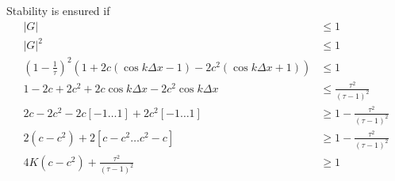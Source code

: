 \documentclass[12pt]{article}
\begin{document}
Stability is ensured if
\begin{align*}
|G|&\leq 1 \\
|G|^2&\leq 1 \\
\left(1-\frac{1}{\tau}\right)^2\left(1
		+2c\left(\cos{k\Delta x}-1\right)
		-2c^2\left(\cos{k\Delta x}+1\right)\right)
	&\leq 1 \\
1-2c+2c^2+2c\cos{k\Delta x}-2c^2\cos{k\Delta x}
	&\leq \frac{\tau^2}{\left(\tau-1\right)^2} \\
2c-2c^2-2c[-1 \ldots 1]+2c^2[-1 \ldots 1] &\geq 1-\frac{\tau^2}{\left(\tau-1\right)^2} \\
2\left(c-c^2\right)+2\left[c-c^2 \ldots c^2-c\right] &\geq 1-\frac{\tau^2}{\left(\tau-1\right)^2} \\
4K\left(c-c^2\right) + \frac{\tau^2}{\left(\tau-1\right)^2} &\geq 1
	\tag*{$\forall 0\leq K\leq 1$} \\
\end{align*}
\end{document}

